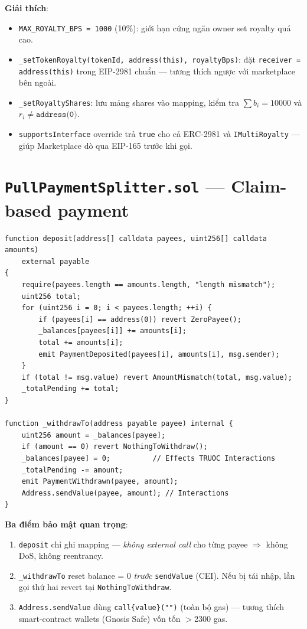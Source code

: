 \documentclass[12pt,a4paper,oneside]{report}
\theoremstyle{plain}
\theoremstyle{definition}
\theoremstyle{remark}
\begin{document}
\textbf{Giải thích}:
\begin{itemize}
  \item \texttt{MAX\_ROYALTY\_BPS = 1000} (10\%): giới hạn cứng ngăn owner set royalty quá cao.
  \item \texttt{\_setTokenRoyalty(tokenId, address(this), royaltyBps)}: đặt \texttt{receiver = address(this)}
        trong EIP-2981 chuẩn — tương thích ngược với marketplace bên ngoài.
  \item \texttt{\_setRoyaltyShares}: lưu mảng shares vào mapping, kiểm tra $\sum b_i = 10000$
        và $r_i \ne \texttt{address(0)}$.
  \item \texttt{supportsInterface} override trả \texttt{true} cho cả ERC-2981 và \texttt{IMultiRoyalty}
        — giúp Marketplace dò qua EIP-165 trước khi gọi.
\end{itemize}

\section{\texttt{PullPaymentSplitter.sol} — Claim-based payment}

\begin{lstlisting}[language=Solidity,caption={Deposit (chỉ ghi mapping) và Withdraw (CEI).}]
function deposit(address[] calldata payees, uint256[] calldata amounts)
    external payable
{
    require(payees.length == amounts.length, "length mismatch");
    uint256 total;
    for (uint256 i = 0; i < payees.length; ++i) {
        if (payees[i] == address(0)) revert ZeroPayee();
        _balances[payees[i]] += amounts[i];
        total += amounts[i];
        emit PaymentDeposited(payees[i], amounts[i], msg.sender);
    }
    if (total != msg.value) revert AmountMismatch(total, msg.value);
    _totalPending += total;
}

function _withdrawTo(address payable payee) internal {
    uint256 amount = _balances[payee];
    if (amount == 0) revert NothingToWithdraw();
    _balances[payee] = 0;          // Effects TRUOC Interactions
    _totalPending -= amount;
    emit PaymentWithdrawn(payee, amount);
    Address.sendValue(payee, amount); // Interactions
}
\end{lstlisting}

\textbf{Ba điểm bảo mật quan trọng}:
\begin{enumerate}
  \item \texttt{deposit} chỉ ghi mapping — \emph{không external call} cho từng payee
        $\Rightarrow$ không DoS, không reentrancy.
  \item \texttt{\_withdrawTo} reset balance = 0 \emph{trước} \texttt{sendValue} (CEI).
        Nếu bị tái nhập, lần gọi thứ hai revert tại \texttt{NothingToWithdraw}.
  \item \texttt{Address.sendValue} dùng \texttt{call\{value\}("")} (toàn bộ gas) — tương thích
        smart-contract wallets (Gnosis Safe) vốn tốn $>$2300 gas.
\end{enumerate}
\end{document}

